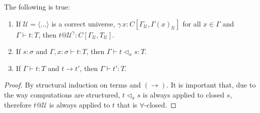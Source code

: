 \documentclass[acmsmall, review, screen, authorversion]{acmart}
\begin{document}
\begin{theorem}
    The following is true:
    \begin{enumerate}
        \item If $\mathcal{U}=\langle\ldots\rangle$
            is a correct universe,
            $\gamma\,x:C[\Gamma_\mathcal{U},\Gamma(x)_\mathcal{U}]$
            for all $x\in\Gamma$ and $\Gamma\vdash t:T$, then
            $t@\mathcal{U}^\gamma:
                C[\Gamma_\mathcal{U},T_\mathcal{U}]$.

        \item If $s:\sigma$ and $\Gamma,x:\sigma\vdash t:T$, then
            $\Gamma\vdash t\triangleleft_x s:T$.

        \item If $\Gamma\vdash t:T$ and $t\to t'$, then
            $\Gamma\vdash t':T$.
    \end{enumerate}
\end{theorem}
\begin{proof}
    By structural induction on terms and $(\to)$. It is important
    that, due to the way computations are structured,
    $t\triangleleft_x s$ is always applied to closed $s$, therefore
    $t@\mathcal{U}$ is always applied to $t$ that is
    $\forall$-closed.
\end{proof}
\end{document}
